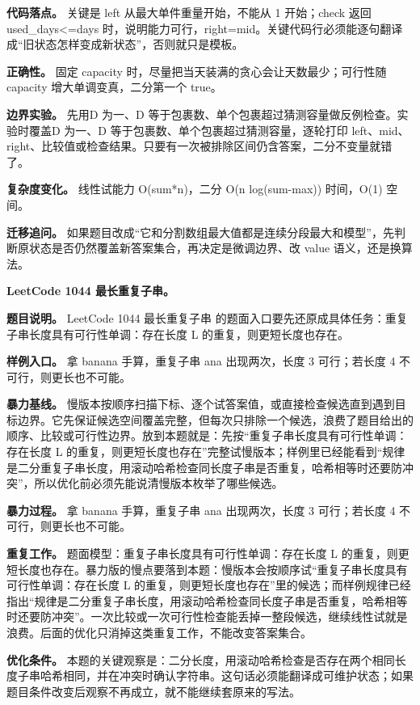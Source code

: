 \textbf{代码落点。} 关键是 left 从最大单件重量开始，不能从 1 开始；check 返回 used\_days<=days 时，说明能力可行，right=mid。关键代码行必须能逐句翻译成“旧状态怎样变成新状态”，否则就只是模板。

\textbf{正确性。} 固定 capacity 时，尽量把当天装满的贪心会让天数最少；可行性随 capacity 增大单调变真，二分第一个 true。

\textbf{边界实验。} 先用D 为一、D 等于包裹数、单个包裹超过猜测容量做反例检查。实验时覆盖D 为一、D 等于包裹数、单个包裹超过猜测容量，逐轮打印 left、mid、right、比较值或检查结果。只要有一次被排除区间仍含答案，二分不变量就错了。

\textbf{复杂度变化。} 线性试能力 O(sum*n)，二分 O(n log(sum-max)) 时间，O(1) 空间。

\textbf{迁移追问。} 如果题目改成“它和分割数组最大值都是连续分段最大和模型”，先判断原状态是否仍然覆盖新答案集合，再决定是微调边界、改 value 语义，还是换算法。

\noindent\textbf{LeetCode 1044 最长重复子串。}

\textbf{题目说明。} LeetCode 1044 最长重复子串 的题面入口要先还原成具体任务：重复子串长度具有可行性单调：存在长度 L 的重复，则更短长度也存在。

\textbf{样例入口。} 拿 banana 手算，重复子串 ana 出现两次，长度 3 可行；若长度 4 不可行，则更长也不可能。

\textbf{暴力基线。} 慢版本按顺序扫描下标、逐个试答案值，或直接检查候选直到遇到目标边界。它先保证候选空间覆盖完整，但每次只排除一个候选，浪费了题目给出的顺序、比较或可行性边界。放到本题就是：先按“重复子串长度具有可行性单调：存在长度 L 的重复，则更短长度也存在”完整试慢版本；样例里已经能看到“规律是二分重复子串长度，用滚动哈希检查同长度子串是否重复，哈希相等时还要防冲突”，所以优化前必须先能说清慢版本枚举了哪些候选。

\textbf{暴力过程。} 拿 banana 手算，重复子串 ana 出现两次，长度 3 可行；若长度 4 不可行，则更长也不可能。

\textbf{重复工作。} 题面模型：重复子串长度具有可行性单调：存在长度 L 的重复，则更短长度也存在。暴力版的慢点要落到本题：慢版本会按顺序试“重复子串长度具有可行性单调：存在长度 L 的重复，则更短长度也存在”里的候选；而样例规律已经指出“规律是二分重复子串长度，用滚动哈希检查同长度子串是否重复，哈希相等时还要防冲突”。一次比较或一次可行性检查能丢掉一整段候选，继续线性试就是浪费。后面的优化只消掉这类重复工作，不能改变答案集合。

\textbf{优化条件。} 本题的关键观察是：二分长度，用滚动哈希检查是否存在两个相同长度子串哈希相同，并在冲突时确认字符串。这句话必须能翻译成可维护状态；如果题目条件改变后观察不再成立，就不能继续套原来的写法。

